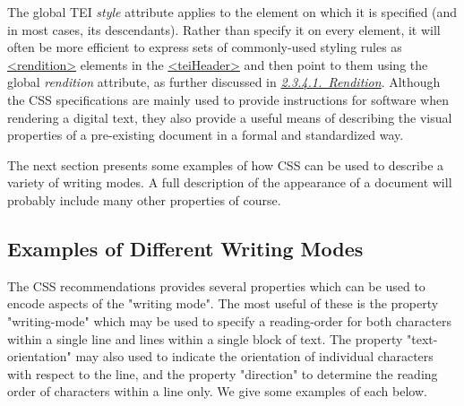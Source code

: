 The global TEI {\itshape style} attribute applies to the element on which it is specified (and in most cases, its descendants). Rather than specify it on every element, it will often be more efficient to express sets of commonly-used styling rules as \hyperref[TEI.rendition]{<rendition>} elements in the \hyperref[TEI.teiHeader]{<teiHeader>} and then point to them using the global {\itshape rendition} attribute, as further discussed in \textit{\hyperref[HD57-1]{2.3.4.1.\ Rendition}}. Although the CSS specifications are mainly used to provide instructions for software when rendering a digital text, they also provide a useful means of describing the visual properties of a pre-existing document in a formal and standardized way.\par
The next section presents some examples of how CSS can be used to describe a variety of writing modes. A full description of the appearance of a document will probably include many other properties of course. 
\subsection[{Examples of Different Writing Modes}]{Examples of Different Writing Modes}\label{WDWMEG}\par
The CSS recommendations provides several properties which can be used to encode aspects of the "writing mode". The most useful of these is the property "writing-mode" which may be used to specify a reading-order for both characters within a single line and lines within a single block of text. The property "text-orientation" may also used to indicate the orientation of individual characters with respect to the line, and the property "direction" to determine the reading order of characters within a line only. We give some examples of each below. 
